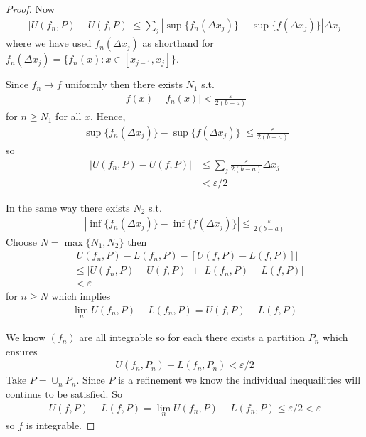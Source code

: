 \begin{proof}
    Now 
    \begin{align*}
        |U(f_n,P) - U(f,P)| \leq \sum_j |\sup\{ f_n(\Delta x_j) \} - \sup\{ f(\Delta x_j) \}| \Delta x_j
    \end{align*}
    where we have used $f_n(\Delta x_j)$ as shorthand for $f_n(\Delta x_j) 
    = \{ f_n(x) : x\in [x_{j-1},x_j] \}$.

    Since $f_n \rightarrow f$ uniformly then there exists $N_1$ s.t.
    \begin{align*}
        |f(x)-f_n(x)| < \frac{\varepsilon}{2(b-a)}
    \end{align*}
    for $n\geq N_1$ for all $x$.
    Hence, 
    \begin{align*}
        |\sup\{ f_n(\Delta x_j) \} - \sup\{ f(\Delta x_j) \}| \leq \frac{\varepsilon}{2(b-a)}
    \end{align*}
    so 
    \begin{align*}
        |U(f_n,P) - U(f,P)| &\leq \sum_j \frac{\varepsilon}{2(b-a)} \Delta x_j \\
        &< \varepsilon/2
    \end{align*}

    In the same way there exists $N_2$ s.t. 
    \begin{align*}
        |\inf\{ f_n(\Delta x_j) \} - \inf\{ f(\Delta x_j) \}| \leq \frac{\varepsilon}{2(b-a)}
    \end{align*}
    Choose $N=\max\{N_1, N_2\}$ then 
    \begin{align*}
        &|U(f_n,P) - L(f_n,P) - [U(f,P) - L(f,P)]| \\ &\leq |U(f_n,P) - U(f,P)| + |L(f_n,P)- L(f,P)| \\
                                                &< \varepsilon
    \end{align*}
    for $n\geq N$ which implies  
    \begin{align*}
        \lim_n U(f_n,P) - L(f_n,P) = U(f,P) - L(f,P)
    \end{align*}

    We know $(f_n)$ are all integrable so for each there exists a 
    partition $P_n$ which ensures 
    \begin{align*}
        U(f_n, P_n) - L(f_n, P_n) < \varepsilon/2
    \end{align*}
    Take $P = \cup_n P_n$. Since $P$ is a refinement we know 
    the individual inequailities will continus to be satisfied. 
    So 
    \begin{align*}
        U(f,P) - L(f,P) = \lim_n U(f_n,P) - L(f_n,P) \leq \varepsilon/2 < \varepsilon
    \end{align*}
    so $f$ is integrable.
\end{proof}


